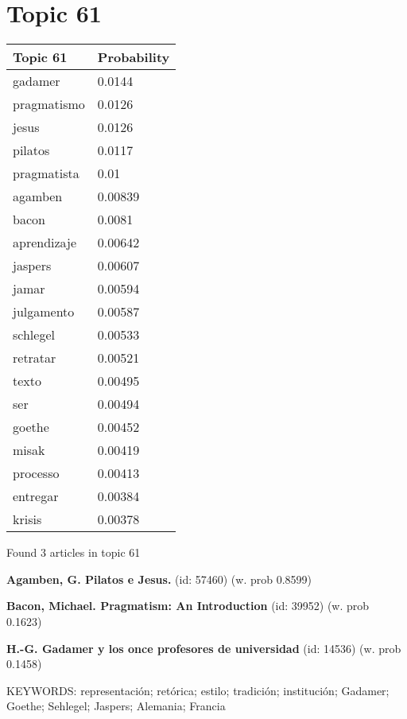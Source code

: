 \documentclass{article}
\begin{document}
\centering
\thispagestyle{empty}
\section*{Topic 61}\vfill
\begin{tabular}{ll}
\toprule
    Topic 61 & Probability \\
\midrule
     gadamer &      0.0144 \\
 pragmatismo &      0.0126 \\
       jesus &      0.0126 \\
     pilatos &      0.0117 \\
 pragmatista &        0.01 \\
     agamben &     0.00839 \\
       bacon &      0.0081 \\
 aprendizaje &     0.00642 \\
     jaspers &     0.00607 \\
       jamar &     0.00594 \\
  julgamento &     0.00587 \\
    schlegel &     0.00533 \\
    retratar &     0.00521 \\
       texto &     0.00495 \\
         ser &     0.00494 \\
      goethe &     0.00452 \\
       misak &     0.00419 \\
    processo &     0.00413 \\
    entregar &     0.00384 \\
      krisis &     0.00378 \\
\bottomrule
\end{tabular}

\vfill
Found 3 articles in topic 61
\vfill

\textbf{Agamben, G. Pilatos e Jesus.} (id: 57460)
 (w. prob 0.8599)
\vfill

\textbf{Bacon, Michael. Pragmatism: An Introduction} (id: 39952)
 (w. prob 0.1623)
\vfill

\textbf{H.-G. Gadamer y los once profesores de universidad} (id: 14536)
 (w. prob 0.1458)


KEYWORDS:
representación; retórica; estilo; tradición; institución; Gadamer; Goethe; Sehlegel; Jaspers; Alemania; Francia

\vfill
\newpage


\centering
\thispagestyle{empty}
\end{document}
